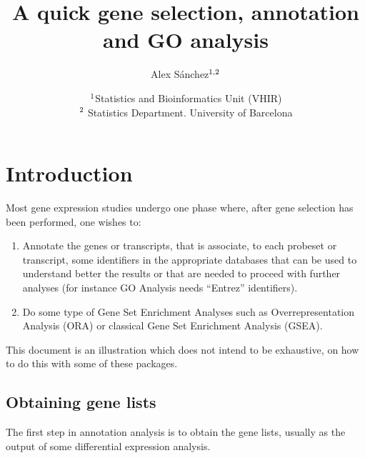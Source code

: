 \documentclass{article}\usepackage[]{graphicx}\usepackage[]{color}
\begin{document}
\title{A quick gene selection, annotation and GO analysis}
\author{Alex S\'anchez$\sp {1,2}$}
\date{$\sp 1$Statistics and Bioinformatics Unit (VHIR)\\
 $\sp 2$ Statistics Department. University of Barcelona}

\maketitle

\tableofcontents








\section{Introduction}

Most gene expression studies undergo one phase where, after gene
selection has been performed, one wishes to:
\begin{enumerate}
\item Annotate the genes or transcripts, that is associate, to each
  probeset or transcript, some identifiers in the appropriate
  databases that can be used to understand better the results or that
  are needed to proceed with further analyses (for instance GO
  Analysis needs ``Entrez'' identifiers).
\item Do some type of Gene Set Enrichment Analyses such as
  Overrepresentation Analysis (ORA) or classical Gene Set Enrichment
  Analysis (GSEA).
\end{enumerate}

This document is an illustration which does not intend to be exhaustive, on how to do this with some of these packages.

\subsection{Obtaining gene lists}

The first step in annotation analysis is to obtain the gene lists,
usually as the output of some differential expression analysis.
\end{document}

